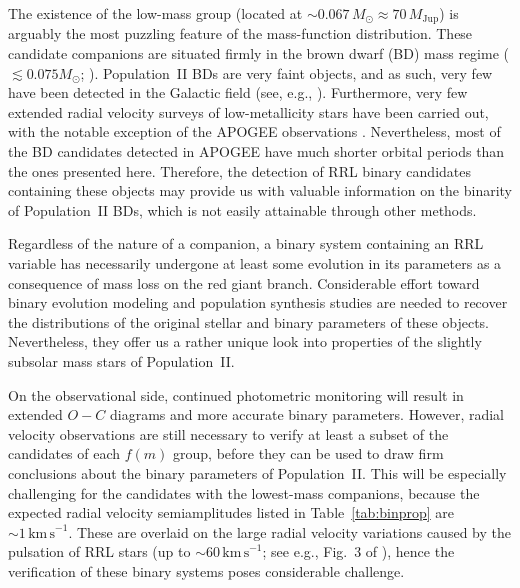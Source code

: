 \documentclass[twocolumn,times]{aastex63}
\begin{document}
The existence of the low-mass group (located at ${\sim0.067}\,M_\odot \approx 70\,M_\mathrm{Jup}$) is arguably the most puzzling feature of the
mass-function distribution. These candidate companions are situated firmly in the brown dwarf (BD) mass regime
(${\lesssim0.075} M_\odot$; \citealt{1997ApJ...491..856B}).  Population~II BDs are very faint objects, and as such, very few have been detected
in the Galactic field (see, e.g., \citealt{2017MNRAS.468..261Z}). Furthermore, very few extended radial velocity surveys of
low-metallicity stars have been carried out, with the notable exception of the APOGEE observations \citep{2016AJ....151...85T,2020ApJ...895....2P}.
Nevertheless, most of the BD candidates detected in APOGEE have much shorter orbital periods than the ones presented here.
Therefore, the detection of RRL binary candidates containing  these objects may provide us with valuable information on the binarity
of Population~II BDs, which is not easily attainable through other methods.

Regardless of the nature of a companion, a binary system containing an RRL variable has necessarily undergone at least some evolution
in its parameters as a consequence of mass loss on the red giant branch. Considerable effort toward binary evolution modeling and
population synthesis studies are needed to recover the distributions of the original stellar and binary parameters of these objects.
Nevertheless, they offer us a rather unique look into properties of the slightly subsolar mass stars of Population~II.

On the observational side, continued photometric monitoring will result in extended $O-C$ diagrams and more accurate binary parameters.
However, radial velocity observations are still necessary to verify at least a subset of the candidates of each $f(m)$ group, before they
can be used to draw firm conclusions about the binary parameters of Population~II. This will be especially
challenging for the candidates with the lowest-mass companions, because the expected radial velocity semiamplitudes listed in Table~\ref{tab:binprop}
are $\sim1\,\mathrm{km\,s}^{-1}$. These are overlaid on the large radial velocity variations caused by the pulsation of RRL stars
(up to $\sim60\,\mathrm{km\,s}^{-1}$; see e.g., Fig.~3 of \citealt{2017MNRAS.468.1317J}), hence the verification of these binary systems poses
considerable challenge.
\end{document}
